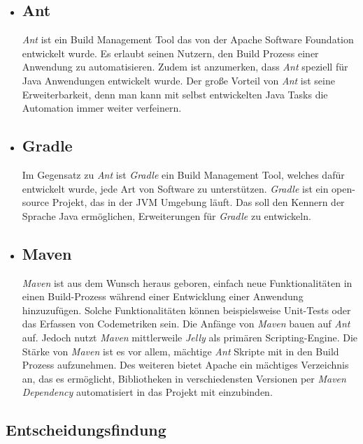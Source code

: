 \begin{itemize}
\item \subsection*{Ant}
\textit{Ant} ist ein Build Management Tool das von der Apache Software Foundation entwickelt wurde. Es erlaubt seinen Nutzern, den Build Prozess einer Anwendung zu automatisieren. Zudem ist anzumerken, dass \textit{Ant} speziell für Java Anwendungen entwickelt wurde. Der große Vorteil von \textit{Ant} ist seine Erweiterbarkeit, denn man kann mit selbst entwickelten Java Tasks die Automation immer weiter verfeinern\autocite[Vgl.][37]{xtreme}.

\item \subsection*{Gradle}
Im Gegensatz zu \textit{Ant} ist \textit{Gradle} ein Build Management Tool, welches dafür entwickelt wurde, jede Art von Software zu unterstützen. \textit{Gradle} ist ein open-source Projekt, das in der \ac{JVM} Umgebung läuft. Das soll den Kennern der Sprache Java ermöglichen, Erweiterungen für \textit{Gradle} zu entwickeln.\autocite[][]{gradle}

\item \subsection*{Maven}
\textit{Maven} ist aus dem Wunsch heraus geboren, einfach neue Funktionalitäten in einen Build-Prozess während einer Entwicklung einer Anwendung hinzuzufügen. Solche Funktionalitäten können beispielsweise Unit-Tests oder das Erfassen von Codemetriken sein. Die Anfänge von \textit{Maven} bauen auf \textit{Ant} auf. Jedoch nutzt \textit{Maven} mittlerweile \textit{Jelly} als primären Scripting-Engine. Die Stärke von \textit{Maven} ist es vor allem, mächtige \textit{Ant} Skripte mit in den Build Prozess aufzunehmen\autocite[Vgl.][457]{xtreme}. Des weiteren bietet Apache ein mächtiges Verzeichnis an, das es ermöglicht, Bibliotheken in verschiedensten Versionen per \textit{Maven Dependency} automatisiert in das Projekt mit einzubinden.

\end{itemize}

\subsection*{Entscheidungsfindung}

